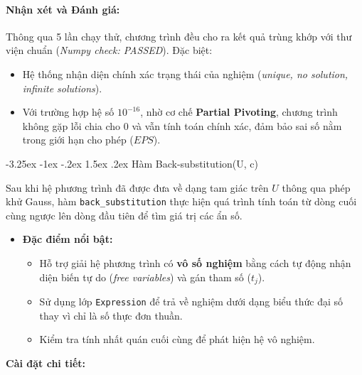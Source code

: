 \documentclass[12pt]{article}
\makeatletter
\newcommand\subsubsubsection{\@startsection{paragraph}{4}{\z@}%
    {-3.25ex \@plus -1ex \@minus -.2ex}%
    {1.5ex \@plus .2ex}%
    {\normalfont\normalsize\bfseries}}
\makeatother
\begin{document}
\paragraph{Nhận xét và Đánh giá:}
Thông qua 5 lần chạy thử, chương trình đều cho ra kết quả trùng khớp với thư viện chuẩn (\textit{Numpy check: PASSED}). Đặc biệt:
\begin{itemize}
    \item Hệ thống nhận diện chính xác trạng thái của nghiệm (\textit{unique, no solution, infinite solutions}).
    \item Với trường hợp hệ số $10^{-16}$, nhờ cơ chế \textbf{Partial Pivoting}, chương trình không gặp lỗi chia cho 0 và vẫn tính toán chính xác, đảm bảo sai số nằm trong giới hạn cho phép ($EPS$).
\end{itemize}

\subsubsubsection{Hàm Back-substitution(U, c)}

Sau khi hệ phương trình đã được đưa về dạng tam giác trên $U$ thông qua phép khử Gauss, hàm \texttt{back\_substitution} thực hiện quá trình tính toán từ dòng cuối cùng ngược lên dòng đầu tiên để tìm giá trị các ẩn số.

\begin{itemize}[leftmargin=1.5cm]
    \item \textbf{Đặc điểm nổi bật:} 
    \begin{itemize}
        \item Hỗ trợ giải hệ phương trình có \textbf{vô số nghiệm} bằng cách tự động nhận diện biến tự do (\textit{free variables}) và gán tham số ($t_j$).
        \item Sử dụng lớp \texttt{Expression} để trả về nghiệm dưới dạng biểu thức đại số thay vì chỉ là số thực đơn thuần.
        \item Kiểm tra tính nhất quán cuối cùng để phát hiện hệ vô nghiệm.
    \end{itemize}
\end{itemize}

\textbf{Cài đặt chi tiết:}
\end{document}
